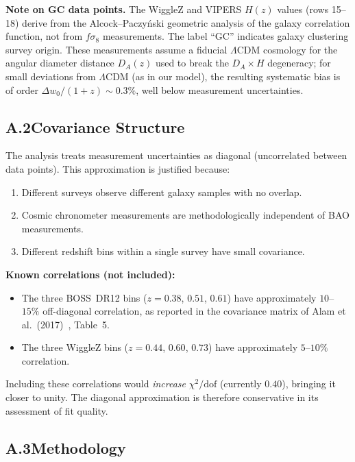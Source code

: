 \noindent\textbf{Note on GC data points.} The WiggleZ and VIPERS $H(z)$ values (rows 15--18) derive from the Alcock--Paczy\'nski geometric analysis of the galaxy correlation function, not from $f\sigma_8$ measurements. The label ``GC'' indicates galaxy clustering survey origin. These measurements assume a fiducial $\Lambda$CDM cosmology for the angular diameter distance $D_A(z)$ used to break the $D_A \times H$ degeneracy; for small deviations from $\Lambda$CDM (as in our model), the resulting systematic bias is of order $\Delta w_0/(1+z) \sim 0.3\%$, well below measurement uncertainties.

\subsection*{A.2\quad Covariance Structure}
\label{sec:2-appA-cov}

The analysis treats measurement uncertainties as diagonal (uncorrelated between data points). This approximation is justified because:
\begin{enumerate}
    \item Different surveys observe different galaxy samples with no overlap.
    \item Cosmic chronometer measurements are methodologically independent of BAO measurements.
    \item Different redshift bins within a single survey have small covariance.
\end{enumerate}

\noindent\textbf{Known correlations (not included):}
\begin{itemize}
    \item The three BOSS~DR12 bins ($z = 0.38$, $0.51$, $0.61$) have approximately $10$--$15\%$ off-diagonal correlation, as reported in the covariance matrix of Alam et al.\ (2017)~\cite{ch2:BOSS2017}, Table~5.
    \item The three WiggleZ bins ($z = 0.44$, $0.60$, $0.73$) have approximately $5$--$10\%$ correlation.
\end{itemize}

Including these correlations would \emph{increase} $\chi^2/\mathrm{dof}$ (currently $0.40$), bringing it closer to unity. The diagonal approximation is therefore conservative in its assessment of fit quality.

\subsection*{A.3\quad Methodology}
\label{sec:2-appA-method}

